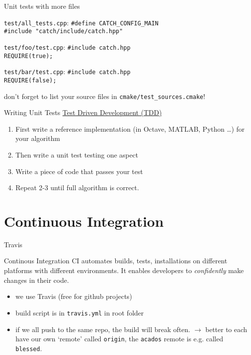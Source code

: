 \documentclass[10pt]{beamer}
\begin{document}
\begin{frame}{Unit tests with more files}
	\begin{beamerboxesrounded}{\texttt{test/all\_tests.cpp}:}
		\texttt{\#define CATCH\_CONFIG\_MAIN} \\
		\texttt{\#include "catch/include/catch.hpp"}
	\end{beamerboxesrounded}
	\vspace{0.1cm}
	\begin{beamerboxesrounded}{\texttt{test/foo/test.cpp}:}
		\texttt{\#include catch.hpp} \\
		\texttt{REQUIRE(true);}
	\end{beamerboxesrounded}
	\vspace{0.1cm}
	\begin{beamerboxesrounded}{\texttt{test/bar/test.cpp}:}
		\texttt{\#include catch.hpp} \\
		\texttt{REQUIRE(false);}
	\end{beamerboxesrounded}
	\vspace{0.1cm}
	\centering don't forget to list your source files in \texttt{cmake/test\_sources.cmake}!
\end{frame}

\begin{frame}{Writing Unit Tests}
	\large \underline{Test Driven Development (TDD)}
	\begin{enumerate}
		\item First write a reference implementation (in Octave, MATLAB, Python \ldots) for your algorithm
		\item Then write a unit test testing one aspect
		\item Write a piece of code that passes your test
		\item Repeat 2-3 until full algorithm is correct.
	\end{enumerate}
\end{frame}

\section{Continuous Integration}

\begin{frame}{Travis}
	\begin{beamerboxesrounded}{Continous Integration}
		CI automates builds, tests, installations on different platforms with different environments. It enables developers to \emph{confidently} make changes in their code.
	\end{beamerboxesrounded}
	\begin{itemize}
		\item we use Travis (free for github projects)
		\item build script is in \texttt{travis.yml} in root folder
		\item if we all push to the same repo, the build will break often. \newline $\rightarrow$ better to each have our own `remote' called \texttt{origin}, the \texttt{acados} remote is e.g. called \texttt{blessed}.
	\end{itemize}
\end{frame}
\end{document}
